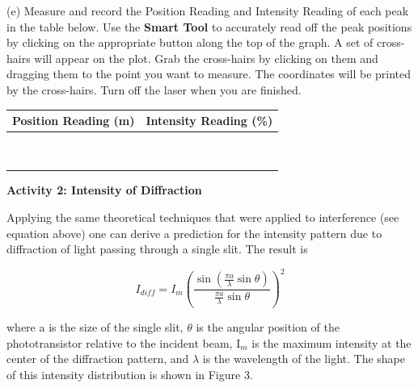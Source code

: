 (e) Measure and record the Position Reading and Intensity Reading
of each peak in the table below.
Use the
{\bf Smart Tool} to accurately read off the peak positions by clicking on the
appropriate button along the top of the graph. A set of cross-hairs will appear on the
plot. Grab the cross-hairs by clicking on them and dragging them to the point you want
to measure.
The coordinates will be printed by the cross-hairs.
Turn off the laser when you are finished.

\vspace{0.3cm}
{\centering \begin{tabular}{|c|c|}
\hline 
Position Reading (m)&
Intensity Reading (\%)\\
\hline
\hline 
&
\\
\hline 
&
\\
\hline 
&
\\
\hline 
&
\\
\hline 
&
\\
\hline 
&
\\
\hline 
&
\\
\hline 
&
\\
\hline 
&
\\
\hline
\end{tabular}\par}
\vspace{0.3cm}

\textbf{Activity 2: Intensity of Diffraction} 

Applying the same theoretical techniques that were applied to interference
(see equation above) one can derive a prediction for the intensity
pattern due to diffraction of light passing through a single slit.
The result is 

\begin{displaymath} I_{diff} = I_m (\frac {\sin (\frac {\pi a} {\lambda} \sin \theta)} {\frac {\pi a} {\lambda} \sin \theta} )^2 \end{displaymath}

where a is the size of the single slit, \( \theta  \) is the angular
position of the phototransistor relative to the incident beam, I\( _{m} \)
is the maximum intensity at the center of the diffraction pattern,
and \( \lambda  \) is the wavelength of the light. The shape of this
intensity distribution is shown in Figure 3.

